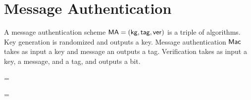 \section{Message Authentication}
\label{sec:msgauth}


A message authentication scheme $\mathsf{MA} = ({\sf kg},\mathsf{tag},\mathsf{ver})$ is a triple of
algorithms. Key generation is randomized and outputs a key. Message
authentication ${\sf Mac}$ takes as input a key and message an outputs a tag.
Verification takes as input a key, a message, and a tag, and outputs a bit. 





\bnm
  \AdvUFCMA{\MA}{\advA} =  
\enm




\bnm
  \AdvUFCMA{\MA}{\advA} =  
\enm

